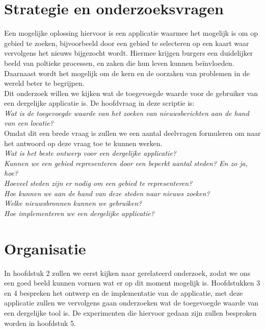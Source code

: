 \documentclass[twoside,openright]{uva-bachelor-thesis}
\begin{document}
	\section{Strategie en onderzoeksvragen}
		Een mogelijke oplossing hiervoor is een applicatie waarmee het mogelijk is om op gebied te zoeken, bijvoorbeeld door een gebied te selecteren op een kaart waar vervolgens het nieuws bijgezocht wordt. Hiermee krijgen burgers een duidelijker beeld van poltieke processen, en zaken die hun leven kunnen be\"invloeden. Daarnaast wordt het mogelijk om de kern en de oorzaken van problemen in de wereld beter te begrijpen.
		\\[0.5cm]
		Dit onderzoek willen we kijken wat de toegevoegde waarde voor de gebruiker van een dergelijke applicatie is. De hoofdvraag in deze scriptie is:
		\\[0.5cm]
		\indent \textit{Wat is de toegevoegde waarde van het zoeken van nieuwsberichten aan de hand van een locatie?}
		\\[0.5cm]
		Omdat dit een brede vraag is zullen we een aantal deelvragen formuleren om naar het antwoord op deze vraag toe te kunnen werken.
		\\[0.5cm]
		\indent \textit{Wat is het beste ontwerp voor een dergelijke applicatie?} \\[0.2cm]
		\indent \textit{Kunnen we een gebied representeren door een beperkt aantal steden? En zo ja, hoe?} \\[0.2cm]
		\indent \textit{Hoeveel steden zijn er nodig om een gebied te representeren?} \\[0.2cm]
		\indent \textit{Hoe kunnen we aan de hand van deze steden naar nieuws zoeken?}\\[0.2cm]
		\indent \textit{Welke nieuwsbronnen kunnen we gebruiken?}\\[0.2cm]
		\indent \textit{Hoe implementeren we een dergelijke applicatie?}\\[0.5cm]
	\section{Organisatie}
		In hoofdstuk 2 zullen we eerst kijken naar gerelateerd onderzoek, zodat we ons een goed beeld kunnen vormen wat er op dit moment mogelijk is. Hoofdstukken 3 en 4 bespreken het ontwerp en de implementatie van de applicatie, met deze applicatie zullen we vervolgens gaan onderzoeken wat de toegevoegde waarde van een dergelijke tool is. De experimenten die hiervoor gedaan zijn zullen besproken worden in hoofdstuk 5.
\end{document}
